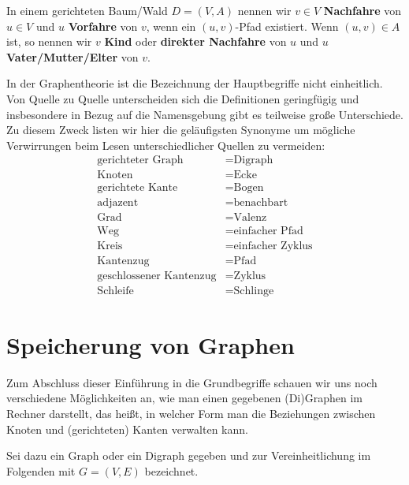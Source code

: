 \begin{defn}
	In einem gerichteten Baum/Wald $D=(V,A)$ nennen wir $v \in V$ \textbf{Nachfahre} von $u \in V$ und $u$ \textbf{Vorfahre} von $v$, wenn ein $(u,v)$-Pfad existiert. Wenn $(u,v) \in A$ ist, so nennen wir $v$ \textbf{Kind} oder \textbf{direkter Nachfahre} von $u$ und $u$ \textbf{Vater/Mutter/Elter} von $v$.
\end{defn} 


\begin{bem}
In der Graphentheorie ist die Bezeichnung der Hauptbegriffe nicht einheitlich.
Von Quelle zu Quelle unterscheiden sich die Definitionen geringfügig und insbesondere in Bezug auf die Namensgebung gibt es teilweise große Unterschiede.
Zu diesem Zweck listen wir hier die geläufigsten Synonyme um mögliche Verwirrungen beim Lesen unterschiedlicher Quellen zu vermeiden:
\begin{align*}
\text{gerichteter Graph} &= \text{Digraph}\\
\text{Knoten} &= \text{Ecke}\\
\text{gerichtete Kante} &= \text{Bogen}\\
\text{adjazent} &= \text{benachbart}\\
\text{Grad} &= \text{Valenz}\\
\text{Weg} &= \text{einfacher Pfad}\\
\text{Kreis} &= \text{einfacher Zyklus}\\
\text{Kantenzug} &= \text{Pfad}\\
\text{geschlossener Kantenzug} &= \text{Zyklus}\\
\text{Schleife} &= \text{Schlinge}
\end{align*}
\end{bem}

\section{Speicherung von Graphen} 

\begin{bem}
Zum Abschluss dieser Einführung in die Grundbegriffe schauen wir uns noch verschiedene Möglichkeiten an, wie man einen gegebenen (Di)Graphen im Rechner darstellt, das heißt, in welcher Form man die Beziehungen zwischen Knoten und (gerichteten) Kanten verwalten kann.

Sei dazu ein Graph oder ein Digraph gegeben und zur Vereinheitlichung im Folgenden mit $G=(V,E)$ bezeichnet.
\end{bem} 

